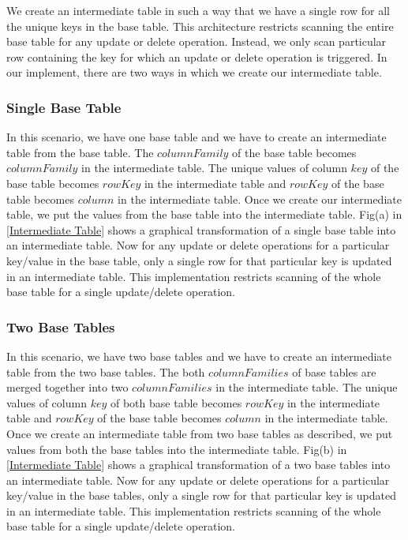 \documentclass[11pt,a4paper,bibtotoc,idxtotoc,headsepline,footsepline,footexclude,BCOR12mm,DIV13]{scrbook}
\begin{document}
We create an intermediate table in such a way that we have a single row for all the unique keys in the base table. This architecture restricts scanning the entire base table for any update or delete operation. Instead, we only scan particular row containing the key for which an update or delete operation is triggered. In our implement, there are two ways in which we create our intermediate table.

\subsubsection{Single Base Table}
\label{Single Base Table}
In this scenario, we have one base table and we have to create an intermediate table from the base table. The $columnFamily$ of the base table becomes $columnFamily$ in the intermediate table. The unique values of column $key$ of the base table becomes $rowKey$ in the intermediate table and $rowKey$ of the base table becomes $column$ in the intermediate table. Once we create our intermediate table, we put the values from the base table into the intermediate table. Fig(a) in \ref{Intermediate Table} shows a graphical transformation of a single base table into an intermediate table. Now for any update or delete operations for a particular key/value in the base table, only a single row for that particular key is updated in an intermediate table. This implementation restricts scanning of the whole base table for a single update/delete operation.

\subsubsection{Two Base Tables}
\label{Two Base Tables}
In this scenario, we have two base tables and we have to create an intermediate table from the two base tables. The both $columnFamilies$ of base tables are merged together into two $columnFamilies$ in the intermediate table. The unique values of column $key$ of both base table becomes $rowKey$ in the intermediate table and $rowKey$ of the base table becomes $column$ in the intermediate table. Once we create an intermediate table from two base tables as described, we put values from both the base tables into the intermediate table. Fig(b) in \ref{Intermediate Table} shows a graphical transformation of a two base tables into an intermediate table. Now for any update or delete operations for a particular key/value in the base tables, only a single row for that particular key is updated in an intermediate table. This implementation restricts scanning of the whole base table for a single update/delete operation.
\end{document}
